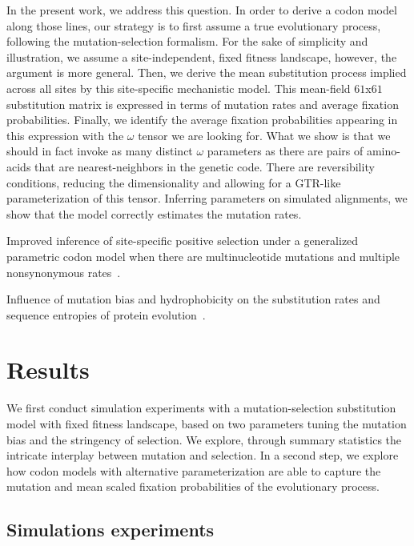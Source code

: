 In the present work, we address this question.
In order to derive a codon model along those lines, our strategy is to first assume a true evolutionary process, following the mutation-selection formalism.
For the sake of simplicity and illustration, we assume a site-independent, fixed fitness landscape, however, the argument is more general.
Then, we derive the mean substitution process implied across all sites by this site-specific mechanistic model.
This mean-field $61$x$61$ substitution matrix is expressed in terms of mutation rates and average fixation probabilities.
Finally, we identify the average fixation probabilities appearing in this expression with the $\omega$ tensor we are looking for.
What we show is that we should in fact invoke as many distinct $\omega$ parameters as there are pairs of amino-acids that are nearest-neighbors in the genetic code.
There are reversibility conditions, reducing the dimensionality and allowing for a GTR-like parameterization of this tensor.
Inferring parameters on simulated alignments, we show that the model correctly estimates the mutation rates.

Improved inference of site-specific positive selection under a generalized parametric codon model when there are multinucleotide mutations and multiple nonsynonymous rates~\citep{Dunn2019}.

Influence of mutation bias and hydrophobicity on the substitution rates and sequence entropies of protein evolution~\citep{Santos2018}.

\section{Results}

We first conduct simulation experiments with a mutation-selection substitution model with fixed fitness landscape, based on two parameters tuning the mutation bias and the stringency of selection.
We explore, through summary statistics the intricate interplay between mutation and selection.
In a second step, we explore how codon models with alternative parameterization are able to capture the mutation and mean scaled fixation probabilities of the evolutionary process.

\subsection{Simulations experiments}

